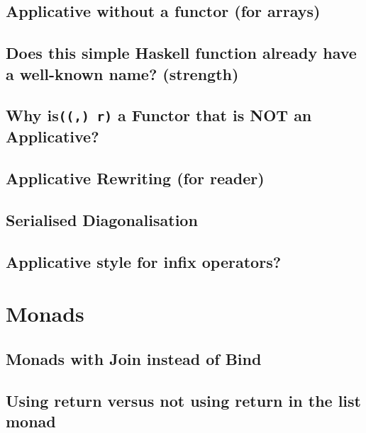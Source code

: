 \documentclass{book}
\begin{document}
\section{Applicative without a functor (for arrays)}


\section{Does this simple Haskell function already have a well-known name? (strength)}


\section{Why is{\tt ((,) r)} a Functor that is NOT an Applicative?}


\section{Applicative Rewriting (for reader)}


\section{Serialised Diagonalisation}


\section{Applicative style for infix operators?}



\chapter{Monads}

\section{Monads with Join instead of Bind}


\section{Using return versus not using return in the list monad}

\end{document}
